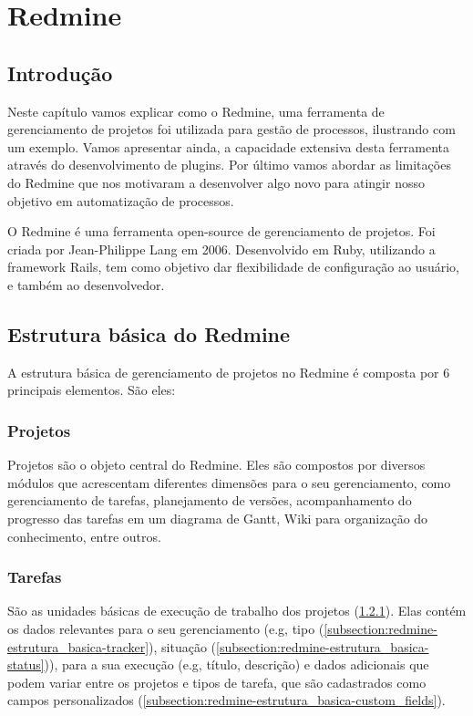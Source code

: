 \chapter{Redmine}\label{chp:redmine}

\section{Introdução}\label{sec:redmine-introducao}
Neste capítulo vamos explicar como o Redmine, uma ferramenta de gerenciamento de projetos foi utilizada para gestão de processos, ilustrando com um exemplo. Vamos apresentar ainda, a capacidade extensiva desta ferramenta através do desenvolvimento de plugins. Por último vamos abordar as limitações do Redmine que nos motivaram a desenvolver algo novo para atingir nosso objetivo em automatização de processos.

O Redmine\cite{redmine} é uma ferramenta open-source de gerenciamento de projetos. Foi criada por Jean-Philippe Lang em 2006. Desenvolvido em Ruby, utilizando a framework Rails, tem como objetivo dar flexibilidade de configuração ao usuário, e também ao desenvolvedor.


\section{Estrutura básica do Redmine}\label{sec:redmine-estrutura_basica}

A estrutura básica de gerenciamento de projetos no Redmine é composta por 6 principais elementos. São eles:

\subsection{Projetos}\label{subsection:redmine-estrutura_basica-projeto}

Projetos são o objeto central do Redmine. Eles são compostos por diversos módulos que acrescentam diferentes dimensões para o seu gerenciamento, como gerenciamento de tarefas, planejamento de versões, acompanhamento do progresso das tarefas em um diagrama de Gantt, Wiki para organização do conhecimento, entre outros. 
\subsection{Tarefas}\label{subsection:redmine-estrutura_basica-tarefa}

São as unidades básicas de execução de trabalho dos projetos (\ref{subsection:redmine-estrutura_basica-projeto}). Elas contém os dados relevantes para o seu gerenciamento (e.g, tipo (\ref{subsection:redmine-estrutura_basica-tracker}), situação (\ref{subsection:redmine-estrutura_basica-status})), para a sua execução (e.g, título, descrição) e dados adicionais que podem variar entre os projetos e tipos de tarefa, que são cadastrados como campos personalizados (\ref{subsection:redmine-estrutura_basica-custom_fields}).  



